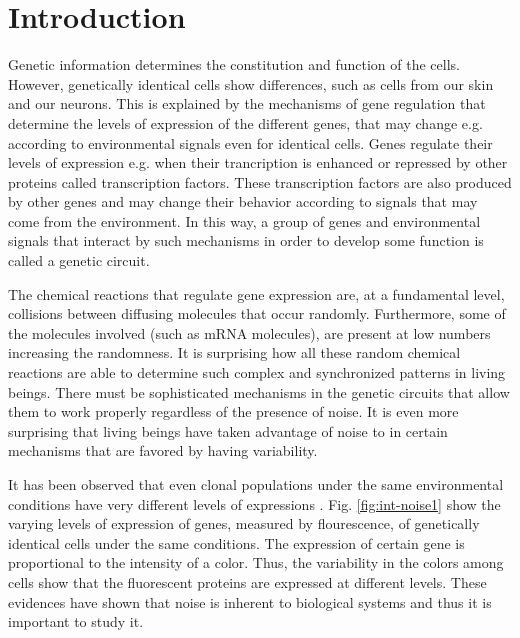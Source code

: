 \chapter*{Introduction}
\renewcommand{\thefigure}{I.\arabic{figure}}

Genetic information determines the constitution and function of the cells. However, genetically identical cells show differences, such as cells from our skin and our neurons. This is explained by the mechanisms of gene regulation that determine the levels of expression of the different genes, that may change e.g. according to environmental signals even for identical cells. Genes regulate their levels of expression e.g. when their trancription is enhanced or repressed by other proteins called transcription factors. These transcription factors are also produced by other genes and may change their behavior according to signals that may come from the environment. In this way, a group of genes and environmental signals that interact by such mechanisms in order to develop some function is called a genetic circuit.

The chemical reactions that regulate gene expression are, at a fundamental level, collisions between diffusing molecules that occur randomly. Furthermore, some of the molecules involved (such as mRNA molecules), are present at low numbers increasing the randomness. It is surprising how all these random chemical reactions are able to determine such complex and synchronized patterns in living beings. There must be sophisticated mechanisms in the genetic circuits that allow them to work properly regardless of the presence of noise. It is even more surprising that living beings have taken advantage of noise to in certain mechanisms that are favored by having variability.

It has been observed that even clonal populations under the same environmental conditions have very different levels of expressions \cite{elowitz02} \cite{pedraza05}. Fig. \ref{fig:int-noise1} show the varying levels of expression of genes, measured by flourescence, of genetically identical cells under the same conditions. The expression of certain gene is proportional to the intensity of a color. Thus, the variability in the colors among cells show that the fluorescent proteins are expressed at different levels. These evidences have shown that noise is inherent to biological systems and thus it is important to study it.

